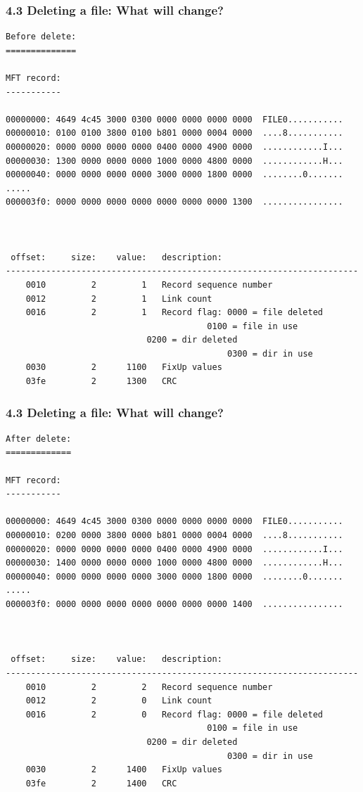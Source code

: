 \begin{frame}[fragile]
  \frametitle{4.3 Deleting a file: What will change?}
  \begin{lstlisting}[basicstyle=\tiny]
Before delete:
==============
  
MFT record:
-----------

00000000: 4649 4c45 3000 0300 0000 0000 0000 0000  FILE0...........
00000010: 0100 0100 3800 0100 b801 0000 0004 0000  ....8...........
00000020: 0000 0000 0000 0000 0400 0000 4900 0000  ............I...
00000030: 1300 0000 0000 0000 1000 0000 4800 0000  ............H...
00000040: 0000 0000 0000 0000 3000 0000 1800 0000  ........0.......
.....
000003f0: 0000 0000 0000 0000 0000 0000 0000 1300  ................



 offset:     size:    value:   description:
----------------------------------------------------------------------
    0010         2         1   Record sequence number
    0012         2         1   Link count
    0016         2         1   Record flag: 0000 = file deleted
	                                    0100 = file in use
				            0200 = dir deleted
                                            0300 = dir in use
    0030         2      1100   FixUp values
    03fe         2      1300   CRC
  \end{lstlisting}
\end{frame}


\begin{frame}[fragile]
  \frametitle{4.3 Deleting a file: What will change?}
  \begin{lstlisting}[basicstyle=\tiny]
After delete:
=============
  
MFT record:
-----------

00000000: 4649 4c45 3000 0300 0000 0000 0000 0000  FILE0...........
00000010: 0200 0000 3800 0000 b801 0000 0004 0000  ....8...........
00000020: 0000 0000 0000 0000 0400 0000 4900 0000  ............I...
00000030: 1400 0000 0000 0000 1000 0000 4800 0000  ............H...
00000040: 0000 0000 0000 0000 3000 0000 1800 0000  ........0.......
.....
000003f0: 0000 0000 0000 0000 0000 0000 0000 1400  ................



 offset:     size:    value:   description:
----------------------------------------------------------------------
    0010         2         2   Record sequence number
    0012         2         0   Link count
    0016         2         0   Record flag: 0000 = file deleted
	                                    0100 = file in use
				            0200 = dir deleted
                                            0300 = dir in use
    0030         2      1400   FixUp values
    03fe         2      1400   CRC
  \end{lstlisting}
\end{frame}


